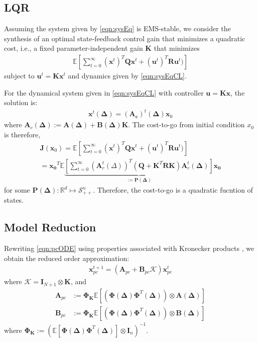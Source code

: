 \documentclass[letterpaper, 10 pt, conference]{ieeeconf}  %
\newcommand{\real}{\mathbb{R}}
\newcommand{\vo}[1]{\boldsymbol{#1}}
\newcommand{\Del}{\vo{\Delta}}
\begin{document}
\subsection{LQR}
Assuming the system given by \eqref{eqn:sysEq} is EMS-stable, we consider the synthesis of an optimal state-feedback control gain that minimizes a quadratic cost, i.e., a fixed parameter-independent gain $\vo{K}$ that minimizes
\begin{align}
	\mathbb{E} \left[ \sum_{t=0}^{\infty} (\vo{x}^t)^T \vo{Q} \vo{x}^t + (\vo{u}^t)^T \vo{R} \vo{u}^t)\right]
\end{align}
subject to $\vo{u}^t = \vo{K}\vo{x}^t$ and dynamics given by \eqref{eqn:sysEqCL}.


For the dynamical system given in \eqref{eqn:sysEqCL} with controller $\vo{u} = \vo{Kx}$, the solution is:
\begin{align}
	\vo{x}^t(\Del) = (\vo{A_c})^{t}(\Del)\vo{x}_0
\end{align}
where $\vo{A}_c(\Del) := \vo{A}(\Del) + \vo{B}(\Del)\vo{K}$. The cost-to-go from initial condition $x_0$ is therefore,
\begin{gather}
	\vo{J}(\vo{x}_0) = \mathbb{E}\left[ \sum_{t=0}^{\infty} (\vo{x}^t)^T \vo{Q} \vo{x}^t + (\vo{u}^t)^T \vo{R} \vo{u}^t)\right] \nonumber\\
							= \vo{x_0}^T \mathbb{E} \underbrace{\left[  \sum_{t=0}^{\infty} (\vo{A}_c^{t}(\Delta))^T(\vo{Q} + \vo{K}^T\vo{RK}) \vo{A}_c^{t}(\Del) \right]}_{\vo{:=P(\Delta)}} \vo{x_0}
\end{gather}
for some $\vo{P(\Delta)} : \real^d \mapsto \mathcal{S}_{++}^n$. Therefore, the cost-to-go is a quadratic fucntion of states.

\subsection{Model Reduction}
Rewriting \eqref{eqn:pcODE} using properties associated with Kronecker products \cite{bhattacharya2014robust}, we obtain the reduced order approximation:
\begin{align}
   \vo{x}_{pc}^{t+1} = (\vo{A}_{pc} + \vo{B}_{pc}\vo{\mathcal{K}})\vo{x}_{pc}^{t}
\end{align}
where $\vo{\mathcal{K}} = \vo{I}_{N+1} \otimes \vo{K}$, and
\begin{align}
   \vo{A}_{pc} &:= \vo{\Phi_K} %
	\mathbb{E}[(\vo{\Phi}(\Del)  \vo{\Phi}^T(\Del)) \otimes \vo{A}(\Del)] \\
   \vo{B}_{pc} &:= \vo{\Phi_K}  %
	\mathbb{E}[(\vo{\Phi}(\Del)  \vo{\Phi}^T(\Del)) \otimes \vo{B}(\Del)]
\end{align}
where $\vo{\Phi_K} := (\mathbb{E}[\vo{\Phi}(\Del)  \vo{\Phi}^T(\Del)] \otimes \vo{I}_n)^{-1}$.
\end{document}
